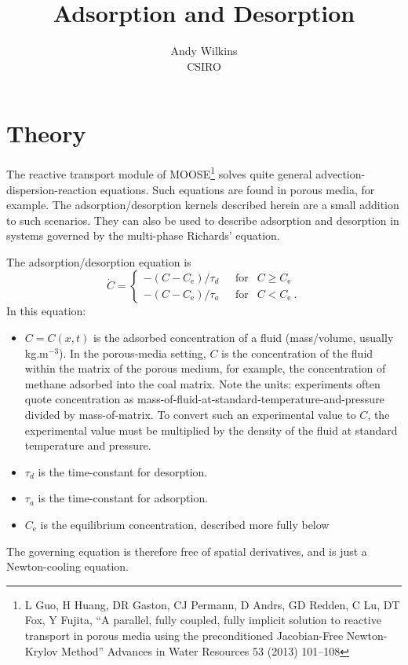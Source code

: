 \documentclass[]{scrreprt}
\begin{document}
\title{Adsorption and Desorption}
\author{Andy Wilkins \\
CSIRO}
\maketitle

\tableofcontents

\chapter{Theory}

The reactive transport module of MOOSE\footnote{L Guo, H Huang, DR
  Gaston, CJ Permann, D Andrs, GD Redden, C Lu, DT Fox, Y Fujita, ``A
  parallel, fully coupled, fully implicit solution to reactive
  transport in porous media using the preconditioned Jacobian-Free
  Newton-Krylov Method'' Advances in Water Resources 53 (2013)
  101--108} solves quite general advection-dispersion-reaction
equations.  Such equations are found in porous media, for example.  The
adsorption/desorption kernels described herein are a small addition to
such scenarios.  They can also be used to describe adsorption and
desorption in systems governed by the multi-phase Richards' equation.

The adsorption/desorption equation is
\begin{equation}
\dot{C} = \left\{
\begin{array}{ll}
-(C - C_{\mathrm{e}})/\tau_{d} & \ \ \ \mbox{for } \ \ C\geq C_{\mathrm{e}} \\
-(C - C_{\mathrm{e}})/\tau_{a} & \ \ \ \mbox{for } \ \ C < C_{\mathrm{e}} 
\ .
\end{array}
\right.
\label{eqn.adde}
\end{equation}
In this equation:
\begin{itemize}
\item $C = C(x,t)$ is the adsorbed concentration of a fluid (mass/volume,
  usually kg.m$^{-3}$).  In the porous-media setting, $C$ is the
  concentration of the fluid within the matrix of the
  porous medium, for example, the concentration of methane adsorbed
  into the coal matrix.   Note the units: experiments often quote
  concentration as mass-of-fluid-at-standard-temperature-and-pressure
  divided by mass-of-matrix.  To convert such an experimental value to
  $C$, the experimental value must be multiplied by the density of the
  fluid at standard temperature and pressure.
\item $\tau_{d}$ is the time-constant for desorption.
\item $\tau_{a}$ is the time-constant for adsorption.
\item $C_{\mathrm{e}}$ is the equilibrium concentration, described
  more fully below
\end{itemize}
The governing equation is therefore free of spatial derivatives, and
is just a Newton-cooling equation.
\end{document}
